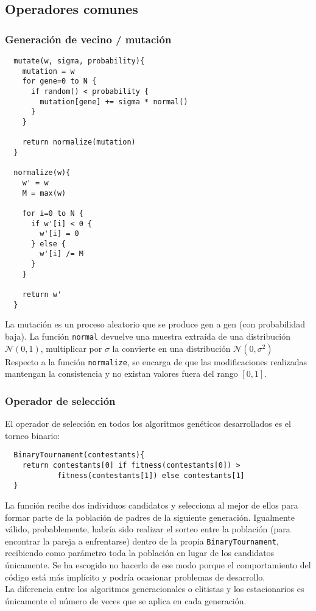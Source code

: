 \documentclass[11pt]{article}
\theoremstyle{plain}
\theoremstyle{definition}
\begin{document}
\subsection{Operadores comunes}
\subsubsection{Generación de vecino / mutación}

\begin{lstlisting}
  mutate(w, sigma, probability){
    mutation = w
    for gene=0 to N {
      if random() < probability {
        mutation[gene] += sigma * normal()
      }
    }

    return normalize(mutation)
  }

  normalize(w){
    w' = w
    M = max(w)

    for i=0 to N {
      if w'[i] < 0 {
        w'[i] = 0
      } else {
        w'[i] /= M
      }
    }

    return w'
  }
\end{lstlisting}

La mutación es un proceso aleatorio que se produce gen a gen (con probabilidad baja). La función \texttt{normal} devuelve
una muestra extraída de una distribución $\mathcal{N}(0,
1)$, multiplicar por $\sigma$ la convierte en una distribución
$\mathcal{N}(0, \sigma^2)$ \\

Respecto a la función \texttt{normalize}, se
encarga de que las modificaciones realizadas mantengan la consistencia
y no existan valores fuera del rango $[0, 1]$. \\

\subsubsection{Operador de selección}

El operador de selección en todos los algoritmos genéticos desarrollados es el
torneo binario: \\

\begin{lstlisting}
  BinaryTournament(contestants){
    return contestants[0] if fitness(contestants[0]) >
            fitness(contestants[1]) else contestants[1]
  }
\end{lstlisting}

La función recibe dos individuos candidatos y selecciona al mejor de ellos para formar parte de la
población de padres de la siguiente generación. Igualmente válido, probablemente, habría sido realizar el sorteo entre la población (para encontrar la pareja a enfrentarse) dentro de la propia \texttt{BinaryTournament}, recibiendo como parámetro toda la población en lugar de los candidatos únicamente. Se ha escogido no hacerlo de ese modo porque el comportamiento del código está más implícito y podría ocasionar problemas de desarrollo. \\
La diferencia entre
los algoritmos generacionales o elitistas y los estacionarios es únicamente el número de veces que se aplica en cada generación. \\
\end{document}
